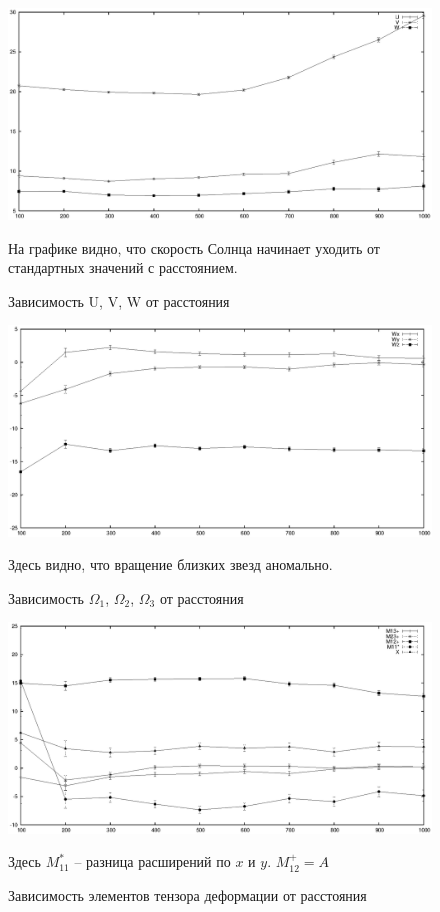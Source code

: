 \documentclass[14pt]{article} %
\begin{document}
\begin{figure}[h!]
\includegraphics[width=1\linewidth]{./graphs/UVW100.eps}
\caption*{Зависимость U, V, W от расстояния}
На графике видно, что скорость Солнца начинает уходить от стандартных значений с расстоянием.
\end{figure}

\begin{figure}[!h]
\includegraphics[width=1\linewidth]{./graphs/Omega100.eps}
\caption*{Зависимость $\Omega_1$, $\Omega_2$, $\Omega_3$ от расстояния}
Здесь видно, что вращение близких звезд аномально.
\end{figure}
\newpage
\begin{figure}[h!]
\includegraphics[width=1\linewidth]{./graphs/M100.eps}
\caption*{Зависимость элементов тензора деформации от расстояния}
Здесь $M_{11}^*$ -- разница расширений по $x$ и $y$. $M_{12}^+=A$
\end{figure}
\end{document}
